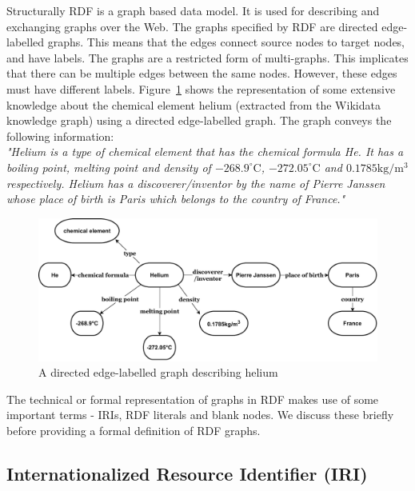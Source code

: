 Structurally RDF is a graph based data model. It is used for describing and exchanging graphs over the Web. The graphs specified by RDF are directed edge-labelled graphs. This means that the edges connect source nodes to target nodes, and have labels. The graphs are a restricted form of multi-graphs. This implicates that there can be multiple edges between the same nodes. However, these edges must have different labels. Figure~\ref{fig:2} shows the representation of some extensive knowledge about the chemical element helium (extracted from the Wikidata knowledge graph) using a directed edge-labelled graph. The graph conveys the following information:\\
\hspace*{0.25cm} \textit{"Helium is a type of chemical element that has the chemical formula He. It has a boiling point, melting point and density of $-268.9^\circ\text{C}$, $-272.05^\circ\text{C}$ and $0.1785\text{kg}/\text{m}^{3}$ respectively. Helium has a discoverer/inventor by the name of Pierre Janssen whose place of birth is Paris which belongs to the country of France."}\\
\begin{figure}[h]
  \centering
  \includegraphics[width=0.95\linewidth]{images/del_graph.drawio.pdf}
  \caption{A directed edge-labelled graph describing helium}
  \label{fig:2}
\end{figure}

The technical or formal representation of graphs in RDF makes use of some important terms - IRIs, RDF literals and blank nodes. We discuss these briefly before providing a formal definition of RDF graphs.

\subsection{Internationalized Resource Identifier (IRI)}

